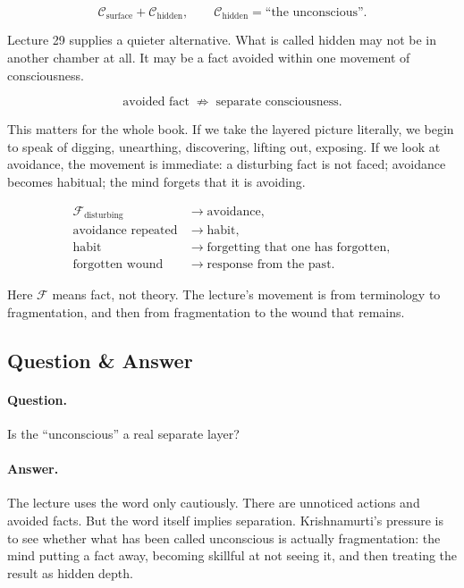 \documentclass[11pt,oneside]{book}
\begin{document}
\begin{equation}
\mathcal{C}_{\text{surface}}+\mathcal{C}_{\text{hidden}},
\qquad
\mathcal{C}_{\text{hidden}}=\text{``the unconscious''}.
\end{equation}

Lecture 29 supplies a quieter alternative. What is called hidden may not be in another chamber at all. It may be a fact avoided within one movement of consciousness.

\begin{equation}
\text{avoided fact} \;\not\Rightarrow\; \text{separate consciousness}.
\end{equation}

This matters for the whole book. If we take the layered picture literally, we begin to speak of digging, unearthing, discovering, lifting out, exposing. If we look at avoidance, the movement is immediate: a disturbing fact is not faced; avoidance becomes habitual; the mind forgets that it is avoiding.

\begin{align}
\mathcal{F}_{\text{disturbing}}
&\longrightarrow \text{avoidance},\\
\text{avoidance repeated}
&\longrightarrow \text{habit},\\
\text{habit}
&\longrightarrow \text{forgetting that one has forgotten},\\
\text{forgotten wound}
&\longrightarrow \text{response from the past}.
\end{align}

Here \(\mathcal{F}\) means fact, not theory. The lecture's movement is from terminology to fragmentation, and then from fragmentation to the wound that remains.

\subsection{Question \& Answer}

\paragraph{Question.}
Is the ``unconscious'' a real separate layer?

\paragraph{Answer.}
The lecture uses the word only cautiously. There are unnoticed actions and avoided facts. But the word itself implies separation. Krishnamurti's pressure is to see whether what has been called unconscious is actually fragmentation: the mind putting a fact away, becoming skillful at not seeing it, and then treating the result as hidden depth.
\end{document}
